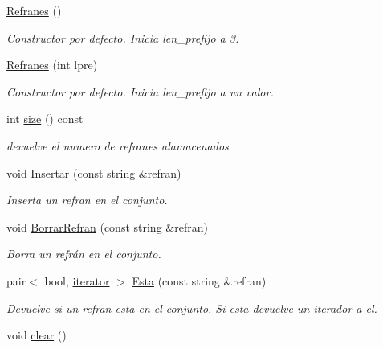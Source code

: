 \begin{DoxyCompactItemize}
\item 
\hyperlink{class_refranes_ab305257e5e582297b2bbde6ded579c90}{Refranes} ()\hypertarget{class_refranes_ab305257e5e582297b2bbde6ded579c90}{}\label{class_refranes_ab305257e5e582297b2bbde6ded579c90}

\begin{DoxyCompactList}\small\item\em Constructor por defecto. Inicia len\+\_\+prefijo a 3. \end{DoxyCompactList}\item 
\hyperlink{class_refranes_a443b3431e0e850e522a6d019ccb7e4a4}{Refranes} (int lpre)\hypertarget{class_refranes_a443b3431e0e850e522a6d019ccb7e4a4}{}\label{class_refranes_a443b3431e0e850e522a6d019ccb7e4a4}

\begin{DoxyCompactList}\small\item\em Constructor por defecto. Inicia len\+\_\+prefijo a un valor. \end{DoxyCompactList}\item 
int \hyperlink{class_refranes_aea4dc940e45f201c1479dd2ba6a753ea}{size} () const \hypertarget{class_refranes_aea4dc940e45f201c1479dd2ba6a753ea}{}\label{class_refranes_aea4dc940e45f201c1479dd2ba6a753ea}

\begin{DoxyCompactList}\small\item\em devuelve el numero de refranes alamacenados \end{DoxyCompactList}\item 
void \hyperlink{class_refranes_a8332ef74ced31681bdb3ad6c864feec9}{Insertar} (const string \&refran)
\begin{DoxyCompactList}\small\item\em Inserta un refran en el conjunto. \end{DoxyCompactList}\item 
void \hyperlink{class_refranes_abd81f45043537e8cfcd5138a7864edb8}{Borrar\+Refran} (const string \&refran)
\begin{DoxyCompactList}\small\item\em Borra un refrán en el conjunto. \end{DoxyCompactList}\item 
pair$<$ bool, \hyperlink{class_refranes_1_1iterator}{iterator} $>$ \hyperlink{class_refranes_a0c16d66bf18195ee4c7ec20c3e06db6f}{Esta} (const string \&refran)
\begin{DoxyCompactList}\small\item\em Devuelve si un refran esta en el conjunto. Si esta devuelve un iterador a el. \end{DoxyCompactList}\item 
void \hyperlink{class_refranes_afca50a716ce083c13a5ab87cbaa45795}{clear} ()\hypertarget{class_refranes_afca50a716ce083c13a5ab87cbaa45795}{}\label{class_refranes_afca50a716ce083c13a5ab87cbaa45795}


\end{DoxyCompactItemize}
